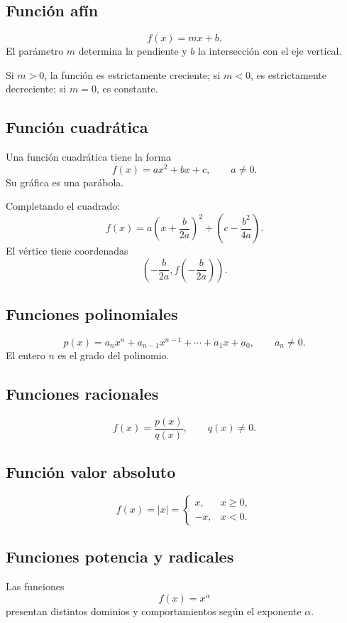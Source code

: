 \documentclass[12pt]{article}
\theoremstyle{remark}
\begin{document}
\subsection{Función afín}

\[
f(x)=mx+b.
\]
El parámetro $m$ determina la pendiente y $b$ la intersección con el eje
vertical.

Si $m>0$, la función es estrictamente creciente; si $m<0$, es estrictamente
decreciente; si $m=0$, es constante.

\subsection{Función cuadrática}

Una función cuadrática tiene la forma
\[
f(x)=ax^2+bx+c,\qquad a\neq0.
\]
Su gráfica es una parábola.

Completando el cuadrado:
\[
f(x)
=a\left(x+\frac{b}{2a}\right)^2
+\left(c-\frac{b^2}{4a}\right).
\]
El vértice tiene coordenadas
\[
\left(
-\frac{b}{2a},
f\left(-\frac{b}{2a}\right)
\right).
\]

\subsection{Funciones polinomiales}

\[
p(x)=a_nx^n+a_{n-1}x^{n-1}+\cdots+a_1x+a_0,
\qquad a_n\neq0.
\]
El entero $n$ es el grado del polinomio.

\subsection{Funciones racionales}

\[
f(x)=\frac{p(x)}{q(x)},\qquad q(x)\neq0.
\]

\subsection{Función valor absoluto}

\[
f(x)=|x|=
\begin{cases}
x,&x\geq0,\\
-x,&x<0.
\end{cases}
\]

\subsection{Funciones potencia y radicales}

Las funciones
\[
f(x)=x^\alpha
\]
presentan distintos dominios y comportamientos según el exponente $\alpha$.
\end{document}
